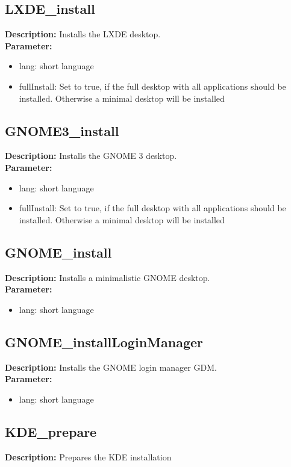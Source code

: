 \subsection{LXDE\_install}
\textbf{Description:} Installs the LXDE desktop.\\
\textbf{Parameter:}
\begin{itemize}
\item lang: short language
\item fullInstall: Set to true, if the full desktop with all applications should be installed. Otherwise a minimal desktop will be installed
\end{itemize}

\subsection{GNOME3\_install}
\textbf{Description:} Installs the GNOME 3 desktop.\\
\textbf{Parameter:}
\begin{itemize}
\item lang: short language
\item fullInstall: Set to true, if the full desktop with all applications should be installed. Otherwise a minimal desktop will be installed
\end{itemize}

\subsection{GNOME\_install}
\textbf{Description:} Installs a minimalistic GNOME desktop.\\
\textbf{Parameter:}
\begin{itemize}
\item lang: short language
\end{itemize}

\subsection{GNOME\_installLoginManager}
\textbf{Description:} Installs the GNOME login manager GDM.\\
\textbf{Parameter:}
\begin{itemize}
\item lang: short language
\end{itemize}

\subsection{KDE\_prepare}
\textbf{Description:} Prepares the KDE installation\\

